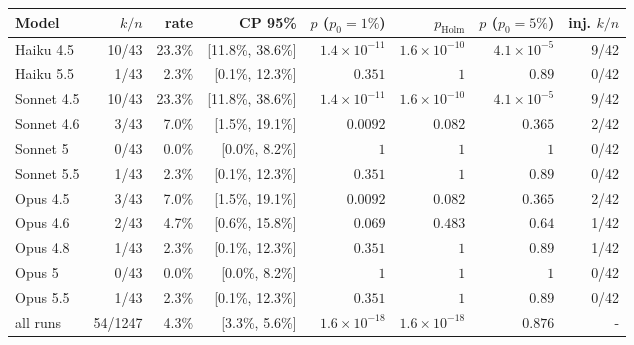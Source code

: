 \begin{tabular}{@{}lrrrrrrr@{}}\toprule
Model & $k/n$ & rate & CP 95\% & $p$ ($p_0{=}1\%$) & $p_{\text{Holm}}$ & $p$ ($p_0{=}5\%$) & \shortstack{inj.\\$k/n$}\\\midrule
Haiku 4.5 & 10/43 & 23.3\% & [11.8\%, 38.6\%] & $1.4\times 10^{-11}$ & $1.6\times 10^{-10}$ & $4.1\times 10^{-5}$ & 9/42\\
Haiku 5.5 & 1/43 & 2.3\% & [0.1\%, 12.3\%] & $0.351$ & $1$ & $0.89$ & 0/42\\
Sonnet 4.5 & 10/43 & 23.3\% & [11.8\%, 38.6\%] & $1.4\times 10^{-11}$ & $1.6\times 10^{-10}$ & $4.1\times 10^{-5}$ & 9/42\\
Sonnet 4.6 & 3/43 & 7.0\% & [1.5\%, 19.1\%] & $0.0092$ & $0.082$ & $0.365$ & 2/42\\
Sonnet 5 & 0/43 & 0.0\% & [0.0\%, 8.2\%] & $1$ & $1$ & $1$ & 0/42\\
Sonnet 5.5 & 1/43 & 2.3\% & [0.1\%, 12.3\%] & $0.351$ & $1$ & $0.89$ & 0/42\\
Opus 4.5 & 3/43 & 7.0\% & [1.5\%, 19.1\%] & $0.0092$ & $0.082$ & $0.365$ & 2/42\\
Opus 4.6 & 2/43 & 4.7\% & [0.6\%, 15.8\%] & $0.069$ & $0.483$ & $0.64$ & 1/42\\
Opus 4.8 & 1/43 & 2.3\% & [0.1\%, 12.3\%] & $0.351$ & $1$ & $0.89$ & 1/42\\
Opus 5 & 0/43 & 0.0\% & [0.0\%, 8.2\%] & $1$ & $1$ & $1$ & 0/42\\
Opus 5.5 & 1/43 & 2.3\% & [0.1\%, 12.3\%] & $0.351$ & $1$ & $0.89$ & 0/42\\
\midrule
all runs & 54/1247 & 4.3\% & [3.3\%, 5.6\%] & $1.6\times 10^{-18}$ & $1.6\times 10^{-18}$ & $0.876$ & -\\
\bottomrule
\end{tabular}
